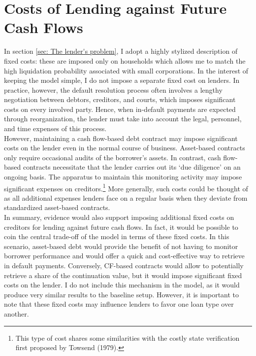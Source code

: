 \documentclass[12pt]{article}
\begin{document}
\section{Costs of Lending against Future Cash Flows \label{sec:fixed costs}}
In section \ref{sec: The lender's problem}, I adopt a highly stylized description of fixed costs: these are imposed only on households which allows me to match the high liquidation probability associated with small corporations. In the interest of keeping the model simple, I do not impose a separate fixed cost on lenders. In practice, however, the default resolution process often involves a lengthy negotiation between debtors, creditors, and courts, which imposes significant costs on every involved party. Hence, when in-default payments are expected through reorganization, the lender must take into account the legal, personnel, and time expenses of this process. \vspace{3mm} \\
However, maintaining a cash flow-based debt contract may impose significant costs on the lender even in the normal course of business. Asset-based contracts only require occasional audits of the borrower's assets. In contrast, cash flow-based contracts necessitate that the lender carries out its `due diligence' on an ongoing basis. The apparatus to maintain this monitoring activity may impose significant expenses on creditors.\footnote{This type of cost shares some similarities with the costly state verification first proposed by Towsend (1979).} More generally, such costs could be thought of as all additional expenses lenders face on a regular basis when they deviate from standardized asset-based contracts.
\vspace{3mm} \\
In summary, evidence would also support imposing additional fixed costs on creditors for lending against future cash flows. In fact, it would be possible to coin the central trade-off of the model in terms of these fixed costs. In this scenario, asset-based debt would provide the benefit of not having to monitor borrower performance and would offer a quick and cost-effective way to retrieve in default payments. Conversely, CF-based contracts would allow to potentially retrieve a share of the continuation value, but it would impose significant fixed costs on the lender. I do not include this mechanism in the model, as it would produce very similar results to the baseline setup. However, it is important to note that these fixed costs may influence lenders to favor one loan type over another.
\end{document}
